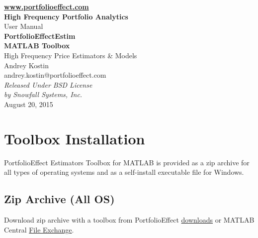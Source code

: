 \documentclass[letterpaper]{report}
\begin{document}
\begin{titlepage}
\begin{center}
\vspace{5cm}
{\bfseries\href{https://www.portfolioeffect.com}{www.portfolioeffect.com} \\
High Frequency Portfolio Analytics\\}
\vspace{8cm}
{\huge User Manual \\}
\vspace{0.3cm}
{\Huge\bfseries PortfolioEffectEstim \\ MATLAB Toolbox \\}
\vspace{0.4cm}
{\Large High Frequency Price Estimators \& Models \\}
\vspace{1.5cm}
{Andrey Kostin \\ andrey.kostin@portfolioeffect.com} \\[14pt]
\vfill
\emph{{Released Under BSD License\\ by Snowfall Systems,
Inc.}}\\[2cm]
{August 20, 2015}
\end{center}
\end{titlepage}

\cleardoublepage
{}
{}
\renewcommand{\bibname}{Contents}
\tableofcontents 

\chapter{Toolbox Installation}
PortfolioEffect Estimators Toolbox for MATLAB is provided as a zip archive for
all types of operating systems and as a self-install executable file for Windows. 

\section{Zip Archive (All OS)}
Download zip archive with a toolbox from
PortfolioEffect
\href{https://www.portfolioeffect.com/docs/platform/quant/tools/matlab}{downloads}
or MATLAB Central
\href{http://www.mathworks.com/matlabcentral/fileexchange/55335-portfolioeffectestim-high-frequency-price-estimators---models-toolbox}{File Exchange}.
 
\end{document}
